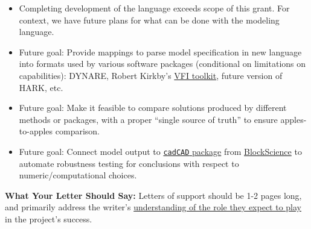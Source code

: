 \documentclass[12pt,pdftex,letterpaper]{article}
\begin{document}
\begin{itemize}
	\item Completing development of the language exceeds scope of this grant. For context, we have future plans for what can be done with the modeling language.
	
	\item Future goal: Provide mappings to parse model specification in new language into formats used by various software packages (conditional on limitations on capabilities): DYNARE, Robert Kirkby's \href{https://www.vfitoolkit.com/}{VFI toolkit}, future version of HARK, etc.
	
	\item Future goal: Make it feasible to compare solutions produced by different methods or packages, with a proper ``single source of truth'' to ensure apples-to-apples comparison.
	
	\item Future goal: Connect model output to \href{https://cadcad.org/}{\texttt{cadCAD} package} from \href{https://block.science/}{BlockScience} to automate robustness testing for conclusions with respect to numeric/computational choices.
	
\end{itemize}

\vspace{0.25cm}

\noindent \textbf{What Your Letter Should Say:}\label{WhatToSay} Letters of support should be 1-2 pages long, and primarily address the writer's \underline{understanding of the role they expect to play} in the project's success.
\end{document}
